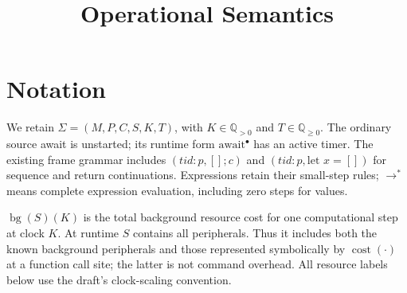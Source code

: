 \documentclass[11pt]{article}
\title{Operational Semantics}
\author{}
\date{}
\newcommand{\m}[1]{\operatorname{#1}}
\begin{document}
\maketitle
\vspace{-2em}

\section{Notation}
We retain $\Sigma=(M,P,C,S,K,T)$, with $K\in\mathbb{Q}_{>0}$ and
$T\in\mathbb{Q}_{\geq0}$. The ordinary source await is unstarted; its runtime
form $\text{await}^{\bullet}$ has an active timer. The existing frame grammar
includes $(tid:p,[];c)$ and $(tid:p,\text{let }x=[])$ for sequence and return
continuations. Expressions retain their small-step rules; $\rightarrow^*$
means complete expression evaluation, including zero steps for values.

$\m{bg}(S)(K)$ is the total background resource cost for one computational
step at clock $K$. At runtime $S$ contains all peripherals. Thus it includes
both the known background peripherals and those represented symbolically by
$\m{cost}(\cdot)$ at a function call site; the latter is not command overhead.
All resource labels below use the draft's clock-scaling convention.
\end{document}
